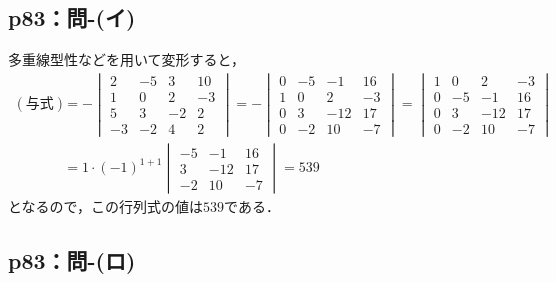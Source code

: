 \documentclass[uplatex,dvipdfmx,a4paper,11pt,fleqn]{jsarticle}
\begin{document}
\newpage 

\subsection*{p83：問-(イ)}

\begin{tleftbar}
    多重線型性などを用いて変形すると，
    \begin{align*} 
        (\text{与式}) & = -
        \begin{vmatrix} 
            2 & -5 & 3 & 10 \\
            1 & 0 & 2 & -3 \\
            5 & 3 & -2 & 2 \\
            -3 & -2 & 4 & 2 
        \end{vmatrix} 
        = - 
        \begin{vmatrix}
            0 & -5 & -1 & 16 \\
            1 & 0 & 2 & -3 \\
            0 & 3 & -12 & 17 \\
            0 & -2 & 10 & -7 
        \end{vmatrix} 
        = 
        \begin{vmatrix}
            1 & 0 & 2 & -3 \\
            0 & -5 & -1 & 16 \\
            0 & 3 & -12 & 17 \\
            0 & -2 & 10 & -7 
        \end{vmatrix} \\
        & = 1 \cdot (-1)^{1+1} 
        \begin{vmatrix} 
            -5 & -1 & 16 \\
            3 & -12 & 17 \\
            -2 & 10 & -7 
        \end{vmatrix} 
        =539 
    \end{align*} 
    となるので，この行列式の値は$539$である．
    \end{tleftbar}


    \subsection*{p83：問-(ロ)}
    
\end{document}
